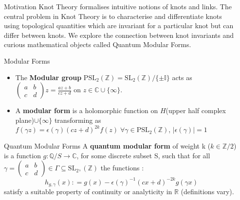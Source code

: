 \documentclass[final,10pt]{beamer}
\newlength{\sepwidth}
\newlength{\colwidth}
\newcommand{\separatorcolumn}{\begin{column}{\sepwidth}\end{column}}
\newcommand{\C}{\mathbb{C}}
\newcommand{\Z}{\mathbb{Z}}
\newcommand{\I}{\mathbb{I}}
\begin{document}
\begin{frame}[t]
\begin{columns}[t]
\separatorcolumn

\begin{column}{\colwidth}


\begin{block}{Motivation}
Knot Theory formalises intuitive notions of knots and links. The central problem in Knot Theory is to characterise and differentiate knots using topological quantities which are invariant for a particular knot but can differ between knots. We explore the connection between knot invariants and curious mathematical objects called Quantum Modular Forms.
\end{block}


\begin{block}{Modular Forms}
    \begin{itemize}
        \item The \textbf{Modular group} $\text{PSL}_2(\Z)=\text{SL}_2(\Z)/\{\pm \I\}$ acts as $\left(\!\begin{smallmatrix}a&b\\c&d\end{smallmatrix}\!\right) z = \frac{az+b}{cz+d}$ on $z\in\C\cup\{\infty\}$.
    
        \item A \textbf{modular form} is a holomorphic function on $H$(upper half complex plane)$\cup\{\infty\}$ transforming as $f(\gamma z)=\epsilon(\gamma)(cz+d)^{2k}f(z)\; \forall \gamma\in\mathrm{PSL}_2(\Z)$,  $|\epsilon(\gamma)| = 1$
    \end{itemize}
\end{block}

\begin{block}{Quantum Modular Forms}
A \textbf{quantum modular form} of weight k ($k \in \mathbb{Z}/2$) is a function $g : \mathbb{Q}/S \rightarrow \mathbb{C}$, for some discrete subset S, such that for all $\gamma = \left(\!\begin{smallmatrix}a&b\\c&d\end{smallmatrix}\!\right) \in \Gamma \subseteq \mathrm{SL}_2, (\mathbb{Z}) $ the functions :
\begin{equation}
    h_{g,\gamma}(x) : = g(x) - \epsilon(\gamma)^{-1}(cx+d)^{-2k}g(\gamma x)
\end{equation}
satisfy a suitable property of continuity or analyticity in $\mathbb{R}$ (definitions vary).
    

\end{block}
\end{column}
\end{columns}
\end{frame}
\end{document}
